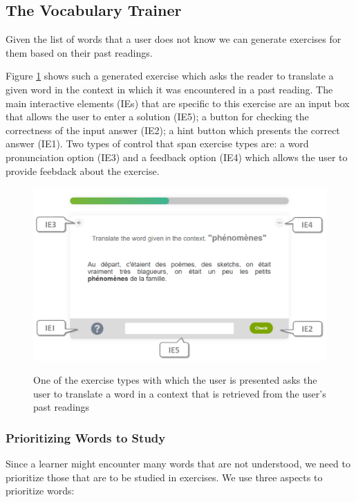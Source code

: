\subsection{The Vocabulary Trainer}

Given the list of words that a user does not know we can generate exercises for them based on their past readings.

Figure \ref{exercise_translate} shows such a generated exercise which asks the reader to translate a given word in the context in which it was encountered in a past reading. The main interactive elements (IEs) that are specific to this exercise are an input box that allows the user to enter a solution (IE5); a button for checking the correctness of the input answer (IE2); a hint button which presents the correct answer (IE1). Two types of control that span exercise types are: a word pronunciation option (IE3) and a feedback option (IE4) which allows the user to provide feebdack about the exercise.

\begin{figure}[h!]
\centering
  \includegraphics[width=0.9\columnwidth]{figures/exercise_translate}
  \caption{One of the exercise types with which the user is presented asks the user to translate a word in a context that is retrieved from the user's past readings}{
  \label{exercise_translate}
  }
\end{figure}

\subsubsection{Prioritizing Words to Study}

Since a learner might encounter many words that are not understood, we need to prioritize those that are to be studied in exercises. We use three aspects to prioritize words: 

